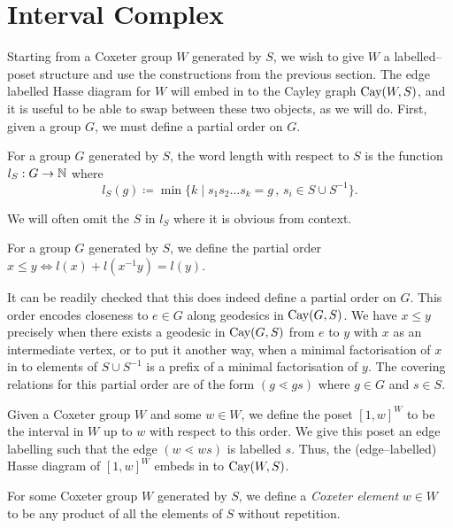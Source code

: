 \documentclass[class=article, crop=false]{standalone}
\begin{document}
\section{Interval Complex}
\label{sec:interval_cx}
Starting from a Coxeter group $W$ generated by $S$, we wish to give $W$ a labelled--poset structure and use the constructions from the previous section. The edge labelled Hasse diagram for $W$ will embed in to the Cayley graph $\text{Cay}(W,S)$, and it is useful to be able to swap between these two objects, as we will do. First, given a group $G$, we must define a partial order on $G$.

\begin{definition}
    For a group $G$ generated by $S$, the word length with respect to $S$ is the function $l_S:G\to \mathbb{\mathbb{N}}$ where
    \begin{equation*}
        l_S(g) \coloneq \min\{k \mid s_1s_2\ldots s_k=g \,,\, s_i \in S \cup S^{-1}\}.
    \end{equation*}
\end{definition}
We will often omit the $S$ in $l_S$ where it is obvious from context.

\begin{definition}
    For a group $G$ generated by $S$, we define the partial order $x \leq y \iff l(x) + l(x^{-1}y) = l(y)$.
\end{definition}

It can be readily checked that this does indeed define a partial 
order on $G$. This order encodes closeness to $e \in G$ along geodesics in $\text{Cay}(G,S)$. We have $x \leq y$ precisely when there exists a geodesic in $\text{Cay}(G, S)$ from $e$ to $y$ with $x$ as an intermediate vertex, or to put it another way, when a minimal factorisation of $x$ in to elements of $S \cup S^{-1}$ is a prefix of a minimal factorisation of $y$. The covering relations for this partial order are of the form $(g \lessdot gs)$ where $g \in G$ and $s \in S$.


Given a Coxeter group $W$ and some $w \in W$, we define the poset $[1,w]^W$ to be the interval in $W$ up to $w$ with respect to this order. We give this poset an edge labelling such that the edge $(w \lessdot ws)$ is labelled $s$. Thus, the (edge--labelled) Hasse diagram of $[1,w]^W$ embeds in to $\text{Cay}(W,S)$.

\begin{definition}
	For some Coxeter group $W$ generated by $S$, we define a \emph{Coxeter element} $w\in W$ to be any product of all the elements of $S$ without repetition.
\end{definition}
\end{document}
